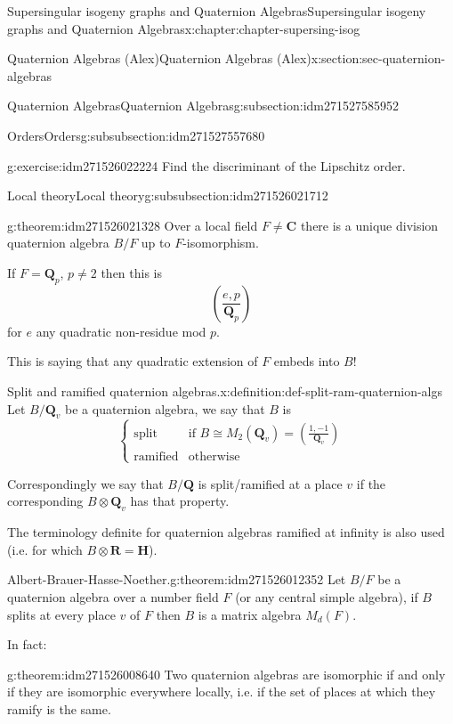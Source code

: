 \documentclass[oneside,10pt,]{book}
\numberwithin{equation}{section}
\newcommand{\legendre}[2]{\left(\frac{#1}{#2}\right)}
\newcommand{\QQ}{\mathbf{Q}}
\newcommand{\RR}{\mathbf{R}}
\newcommand{\CC}{\mathbf{C}}
\newcommand{\HH}{\mathbf{H}}
\newcommand{\amp}{&}
\begin{document}
\begin{chapterptx}{Supersingular isogeny graphs and Quaternion Algebras}{}{Supersingular isogeny graphs and Quaternion Algebras}{}{}{x:chapter:chapter-supersing-isog}
\begin{sectionptx}{Quaternion Algebras (Alex)}{}{Quaternion Algebras (Alex)}{}{}{x:section:sec-quaternion-algebras}
\begin{subsectionptx}{Quaternion Algebras}{}{Quaternion Algebras}{}{}{g:subsection:idm271527585952}
\begin{subsubsectionptx}{Orders}{}{Orders}{}{}{g:subsubsection:idm271527557680}
\begin{inlineexercise}{}{g:exercise:idm271526022224}
Find the discriminant of the Lipschitz order.%
\end{inlineexercise}
\end{subsubsectionptx}
%
%
\typeout{************************************************}
\typeout{************************************************}
%
\begin{subsubsectionptx}{Local theory}{}{Local theory}{}{}{g:subsubsection:idm271526021712}
\begin{theorem}{}{}{g:theorem:idm271526021328}%
Over a local field \(F \ne \CC\) there is a unique division quaternion algebra \(B/F\) up to \(F\)-isomorphism.%
\par
If \(F = \QQ_p\), \(p\ne 2\) then this is%
\begin{equation*}
\legendre{e,p}{\QQ_p}
\end{equation*}
for \(e\) any quadratic non-residue mod \(p\).%
\par
This is saying that any quadratic extension of \(F\) embeds into \(B\)!%
\end{theorem}
\begin{definition}{Split and ramified quaternion algebras.}{x:definition:def-split-ram-quaternion-algs}%
Let \(B/\QQ_v\) be a quaternion algebra, we say that \(B\) is%
\begin{equation*}
\begin{cases}
\text{split} \amp \text{if } B\cong M_2(\QQ_v)  = \legendre{1,-1}{\QQ_v}\\
\text{ramified} \amp \text{otherwise}
\end{cases}
\end{equation*}
%
\par
Correspondingly we say that \(B/\QQ\) is split\slash{}ramified at a place \(v\) if the corresponding \(B\otimes \QQ_v\) has that property.%
\end{definition}
The terminology definite for quaternion algebras ramified at infinity is also used (i.e. for which \(B\otimes \RR = \HH\)).%
\begin{theorem}{Albert-Brauer-Hasse-Noether.}{}{g:theorem:idm271526012352}%
Let \(B/F\) be a quaternion algebra  over  a  number field \(F\) (or any central simple algebra), if \(B\) splits at every place \(v\) of \(F\) then \(B\) is a matrix algebra \(M_d (F)\).%
\end{theorem}
In fact:%
\begin{theorem}{}{}{g:theorem:idm271526008640}%
Two quaternion algebras are isomorphic if and only if they are isomorphic everywhere locally, i.e. if the set of places at which they ramify is the same.%

\end{theorem}
\end{subsubsectionptx}
\end{subsectionptx}
\end{sectionptx}
\end{chapterptx}
\end{document}
